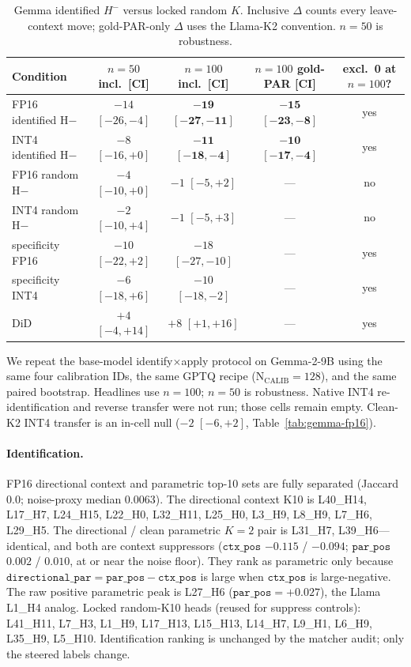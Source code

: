 \documentclass{article} %
\begin{document}
\begin{table}[ht]
\caption{Gemma identified $H^{-}$ versus locked random $K$. Inclusive $\Delta$ counts every leave-context move; gold-PAR-only $\Delta$ uses the Llama-K2 convention. $n{=}50$ is robustness.}
\label{tab:gemma-hminus-n50-n100}
\centering
\footnotesize
\setlength{\tabcolsep}{2pt}
\begin{tabular}{lcccc}
\toprule
Condition & $n{=}50$ incl.\ [CI] & $n{=}100$ incl.\ [CI] & $n{=}100$ gold-PAR [CI] & excl.\ 0 at $n{=}100$? \\
\midrule
FP16 identified H$-$ & $-14$ $[-26,-4]$ & $\mathbf{-19}$ $\mathbf{[-27,-11]}$ & $\mathbf{-15}$ $\mathbf{[-23,-8]}$ & yes \\
INT4 identified H$-$ & $-8$ $[-16,+0]$ & $\mathbf{-11}$ $\mathbf{[-18,-4]}$ & $\mathbf{-10}$ $\mathbf{[-17,-4]}$ & yes \\
FP16 random H$-$ & $-4$ $[-10,+0]$ & $-1$ $[-5,+2]$ & --- & no \\
INT4 random H$-$ & $-2$ $[-10,+4]$ & $-1$ $[-5,+3]$ & --- & no \\
specificity FP16 & $-10$ $[-22,+2]$ & $-18$ $[-27,-10]$ & --- & yes \\
specificity INT4 & $-6$ $[-18,+6]$ & $-10$ $[-18,-2]$ & --- & yes \\
DiD & $+4$ $[-4,+14]$ & $+8$ $[+1,+16]$ & --- & yes \\
\bottomrule
\end{tabular}
\end{table}

We repeat the base-model identify$\times$apply protocol on Gemma-2-9B using the same four calibration IDs, the same GPTQ recipe ($\mathrm{N_{CALIB}{=}128}$), and the same paired bootstrap. Headlines use $n{=}100$; $n{=}50$ is robustness. Native INT4 re-identification and reverse transfer were not run; those cells remain empty. Clean-K2 INT4 transfer is an in-cell null ($-2$ $[-6,+2]$, Table~\ref{tab:gemma-fp16}).

\paragraph{Identification.}
FP16 directional context and parametric top-10 sets are fully separated (Jaccard $0.0$; noise-proxy median $0.0063$). The directional context K10 is L40\_H14, L17\_H7, L24\_H15, L22\_H0, L32\_H11, L25\_H0, L3\_H9, L8\_H9, L7\_H6, L29\_H5. The directional / clean parametric $K{=}2$ pair is L31\_H7, L39\_H6---identical, and both are context suppressors ($\texttt{ctx\_pos}$ $-0.115$ / $-0.094$; $\texttt{par\_pos}$ $0.002$ / $0.010$, at or near the noise floor). They rank as parametric only because $\texttt{directional\_par} = \texttt{par\_pos} - \texttt{ctx\_pos}$ is large when $\texttt{ctx\_pos}$ is large-negative. The raw positive parametric peak is L27\_H6 ($\texttt{par\_pos}{=}+0.027$), the Llama L1\_H4 analog. Locked random-K10 heads (reused for suppress controls): L41\_H11, L7\_H3, L1\_H9, L17\_H13, L15\_H13, L14\_H7, L9\_H1, L6\_H9, L35\_H9, L5\_H10. Identification ranking is unchanged by the matcher audit; only the steered labels change.
\end{document}

